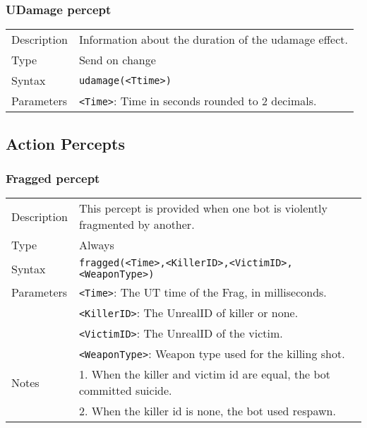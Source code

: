 \documentclass[11pt,a4paper]{article}
\begin{document}
\subsubsection*{UDamage percept}
\begin{small}
\begin{tabular}{p{2cm}p{9cm}}
Description & Information about the duration of the udamage effect.\\
Type & Send on change\\
Syntax & \verb|udamage(<Ttime>)|\\
Parameters & 
\verb|<Time>|: Time in seconds rounded to 2 decimals.\\
\end{tabular}
\end{small}
	
\subsection{Action Percepts}

\subsubsection*{Fragged percept}
\begin{small}
\begin{tabular}{p{2cm}p{9cm}}
Description & This percept is provided when one bot is violently fragmented by another. \\
Type & Always\\
Syntax & \verb|fragged(<Time>,<KillerID>,<VictimID>,<WeaponType>)|\\
Parameters 

& \verb|<Time>|: The UT time of the Frag, in milliseconds.\\
& \verb|<KillerID>|: The UnrealID of killer or none.\\
& \verb|<VictimID>|: The UnrealID of the victim.\\
& \verb|<WeaponType>|: Weapon type used for the killing shot.\\
Notes &
	1.	When the killer and victim id are equal, the bot committed suicide. \\
&	2.	When the killer id is none, the bot used respawn.\\
\end{tabular}
\end{small}
\end{document}
